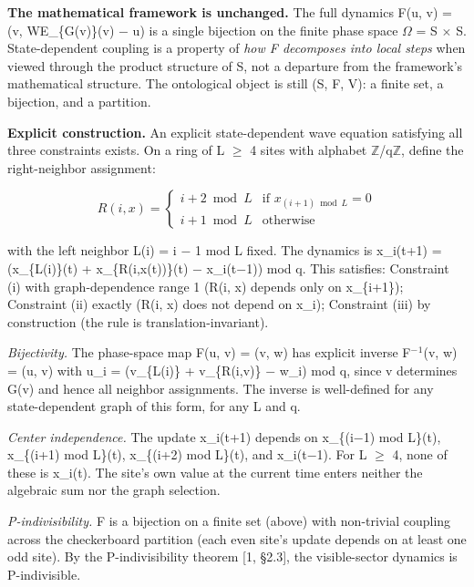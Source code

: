 \documentclass[
  11pt,
]{article}
\begin{document}
\textbf{The mathematical framework is unchanged.} The full dynamics F(u,
v) = (v, WE\_\{G(v)\}(v) \ensuremath{-} u) is a single bijection on the finite phase
space \ensuremath{\Omega} = S \ensuremath{\times} S. State-dependent coupling is a property of \emph{how F
decomposes into local steps} when viewed through the product structure
of S, not a departure from the framework's mathematical structure. The
ontological object is still (S, F, V): a finite set, a bijection, and a
partition.

\textbf{Explicit construction.} An explicit state-dependent wave
equation satisfying all three constraints exists. On a ring of L \ensuremath{\geq} 4
sites with alphabet \ensuremath{\mathbb{Z}}/q\ensuremath{\mathbb{Z}}, define the right-neighbor assignment:

\[R(i, x) = \begin{cases} i+2 \bmod L & \text{if } x_{(i+1) \bmod L} = 0 \\ i+1 \bmod L & \text{otherwise} \end{cases}\]

with the left neighbor L(i) = i \ensuremath{-} 1 mod L fixed. The dynamics is
x\_i(t+1) = (x\_\{L(i)\}(t) + x\_\{R(i,x(t))\}(t) \ensuremath{-} x\_i(t\ensuremath{-}1)) mod q.
This satisfies: Constraint (i) with graph-dependence range 1 (R(i, x)
depends only on x\_\{i+1\}); Constraint (ii) exactly (R(i, x) does not
depend on x\_i); Constraint (iii) by construction (the rule is
translation-invariant).

\emph{Bijectivity.} The phase-space map F(u, v) = (v, w) has explicit
inverse F\ensuremath{^{-}}\ensuremath{^1}(v, w) = (u, v) with u\_i = (v\_\{L(i)\} + v\_\{R(i,v)\} \ensuremath{-}
w\_i) mod q, since v determines G(v) and hence all neighbor assignments.
The inverse is well-defined for any state-dependent graph of this form,
for any L and q.

\emph{Center independence.} The update x\_i(t+1) depends on x\_\{(i\ensuremath{-}1)
mod L\}(t), x\_\{(i+1) mod L\}(t), x\_\{(i+2) mod L\}(t), and x\_i(t\ensuremath{-}1).
For L \ensuremath{\geq} 4, none of these is x\_i(t). The site's own value at the current
time enters neither the algebraic sum nor the graph selection.

\emph{P-indivisibility.} F is a bijection on a finite set (above) with
non-trivial coupling across the checkerboard partition (each even site's
update depends on at least one odd site). By the P-indivisibility
theorem {[}1, §2.3{]}, the visible-sector dynamics is P-indivisible.
\end{document}
